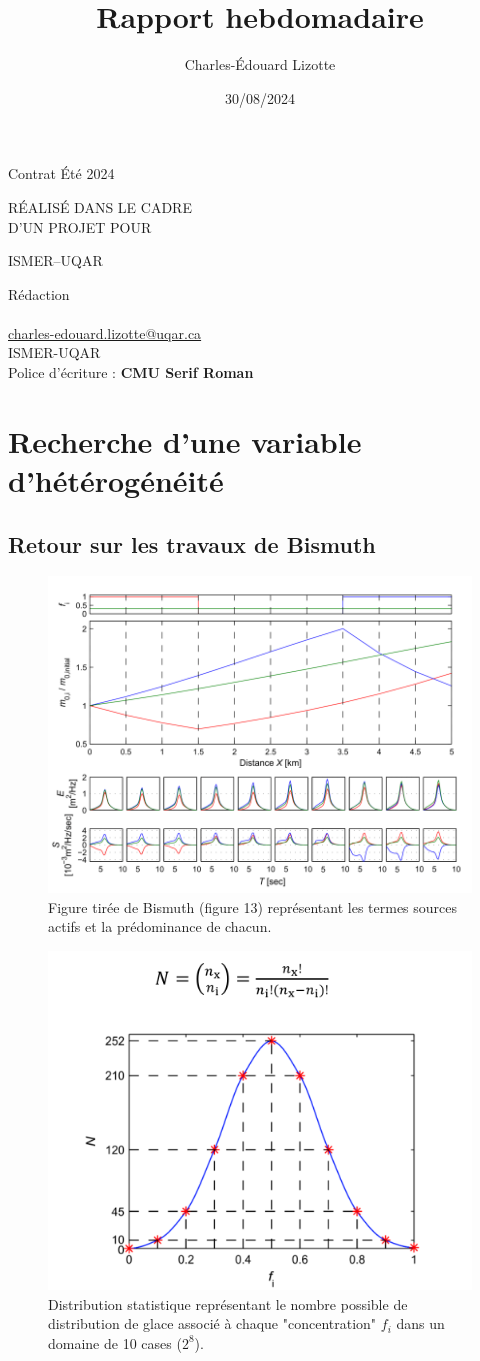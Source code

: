 \documentclass[10pt]{article}
\author{Charles-Édouard Lizotte}
\date{30/08/2024}
\title{Rapport hebdomadaire}
\makeatletter
\numberwithin{equation}{section}
\newcommand{\mytitlepage}{
\begin{titlepage}
\begin{center}
{\Huge \thesubtitle \par}
\vspace{2cm}
{\Huge \MakeUppercase{\thetitle} \par}
\vspace{2cm}
RÉALISÉ DANS LE CADRE\\ D'UN PROJET POUR \par
\vspace{2cm}
{\Huge ISMER--UQAR \par}
\vspace{2cm}
{\thedate}
\end{center}
\vfill
Rédaction \\
{\theauthor}\\
\url{charles-edouard.lizotte@uqar.ca}\\
ISMER-UQAR\\
Police d'écriture : \textbf{CMU Serif Roman}
\end{titlepage}
}
\newcommand{\thesubtitle}{Contrat Été 2024}
\makeatother
\begin{document}
\mytitlepage
\tableofcontents\newpage
\section{Recherche d'une variable d'hétérogénéité}
\label{sec:org8bc5a62}

\subsection{Retour sur les travaux de Bismuth}
\label{sec:org6db6661}

\begin{figure}[htbp]
\centering
\includegraphics[width=.9\linewidth]{Figures/figures/Bismuth-fig13.png}
\caption{Figure tirée de Bismuth (figure 13) représentant les termes sources actifs et la prédominance de chacun.}
\end{figure}

\begin{figure}[htbp]
\centering
\includegraphics[width=.9\linewidth]{Figures/figures/Bismuth-fig10.png}
\caption{Distribution statistique représentant le nombre possible de distribution de glace associé à chaque "concentration" \(f_i\) dans un domaine de 10 cases (\(2^8\)).}
\end{figure}
\end{document}
